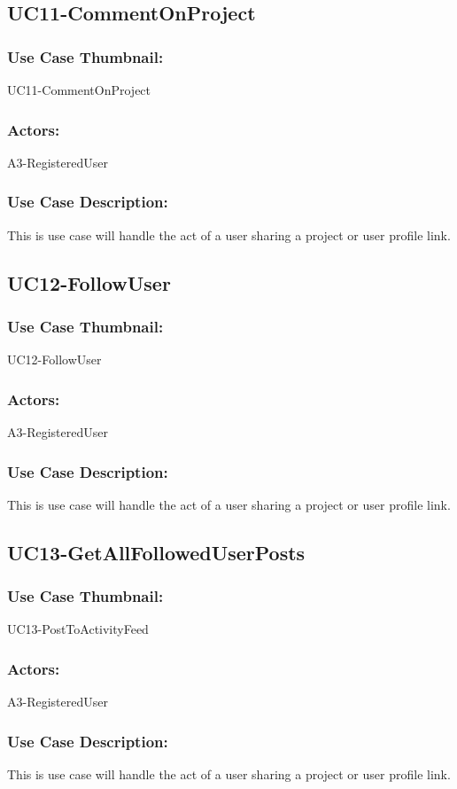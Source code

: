 \documentclass[11pt, openany]{report}
\begin{document}
\subsection{UC11-CommentOnProject}
\label{sUC11}
\subsubsection*{Use Case Thumbnail:}
UC11-CommentOnProject
\subsubsection*{Actors:}
A3-RegisteredUser
\subsubsection*{Use Case Description:}
This is use case will handle the act of a user sharing a project or user profile link.


\subsection{UC12-FollowUser}
\label{sUC12}
\subsubsection*{Use Case Thumbnail:}
UC12-FollowUser
\subsubsection*{Actors:}
A3-RegisteredUser
\subsubsection*{Use Case Description:}
This is use case will handle the act of a user sharing a project or user profile link.


\subsection{UC13-GetAllFollowedUserPosts}
\label{sUC13}
\subsubsection*{Use Case Thumbnail:}
UC13-PostToActivityFeed
\subsubsection*{Actors:}
A3-RegisteredUser
\subsubsection*{Use Case Description:}
This is use case will handle the act of a user sharing a project or user profile link.
\end{document}
